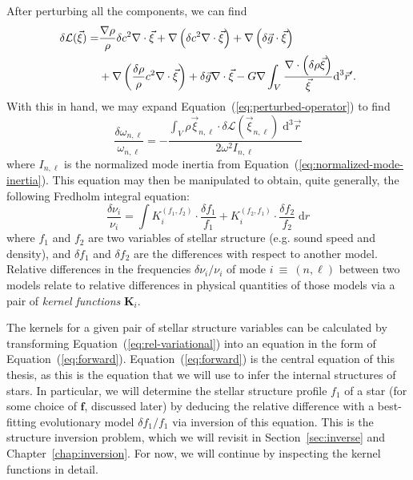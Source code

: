 \fi
After perturbing all the components, we can find
\begin{align}
    \delta\mathcal{L}(\vec\xi)
    =
    &\frac{\nabla\rho}{\rho} \delta c^2 \nabla\cdot \vec\xi
    +
    \nabla\left(
        \delta c^2 \nabla \cdot \vec\xi
    \right)
    +
    \nabla\left(
        \delta\vec g
        \cdot
        \vec\xi
    \right)
    \notag\\
    &+
    \nabla\left(
        \frac{\delta\rho}{\rho}
        c^2\nabla\cdot\vec\xi
    \right)
    +
    \delta\vec g \nabla\cdot\vec\xi
    -
    G\nabla\int_V
        \frac{\nabla\cdot \left( \delta\rho\vec\xi \right)}{\vec\xi}
    \text{d}^3 \vec r'.
\end{align}
With this in hand, we may expand Equation~(\ref{eq:perturbed-operator}) to find
\begin{equation} \label{eq:rel-variational}
    \frac{\delta\omega_{n,\ell}}{\omega_{n,\ell}}
    =
    -\frac{\int_V
            \rho \vec \xi_{n,\ell}
            \cdot
            \delta \mathcal{L}(\vec \xi_{n,\ell})
        \;\text{d}^3 \vec r}{2\omega^2 I_{n,\ell}}
\end{equation}
where $I_{n,\ell}$ is the normalized mode inertia from Equation~(\ref{eq:normalized-mode-inertia}). 
This equation may then be manipulated to obtain, quite generally, the following Fredholm integral equation:
\begin{equation} \label{eq:forward} \boxed{
  \frac{\delta\nu_i}{\nu_i} 
  = 
  \int K_i^{(f_1, f_2)} \cdot \frac{\delta f_1}{f_1}
                + K_i^{(f_2, f_1)} \cdot \frac{\delta f_2}{f_2}
       \;\text{d}r
} \end{equation}
where $f_1$ and $f_2$ are two variables of stellar structure (e.g. sound speed and density), and
${\delta f_1}$ and ${\delta f_2}$ are the differences with respect to another model. %
Relative differences in the frequencies ${\delta\nu_i/\nu_i}$ of mode ${i~\equiv~(n,\ell)}$ between two models relate to relative differences in physical quantities of those models via a pair of \emph{kernel functions} $\mathbf K_i$. 

The kernels for a given pair of stellar structure variables can be calculated by transforming Equation~(\ref{eq:rel-variational}) into an equation in the form of Equation~(\ref{eq:forward}). 
Equation~(\ref{eq:forward}) is the central equation of this thesis, as this is the equation that we will use to infer the internal structures of stars. 
In particular, we will determine the stellar structure profile $f_1$ of a star (for some choice of $\mathbf{f}$, discussed later) by deducing the relative difference with a best-fitting evolutionary model ${\delta f_1/f_1}$ via inversion of this equation. 
This is the structure inversion problem, which we will revisit in Section~\ref{sec:inverse} and Chapter~\ref{chap:inversion}. 
For now, we will continue by inspecting the kernel functions in detail. 
%



